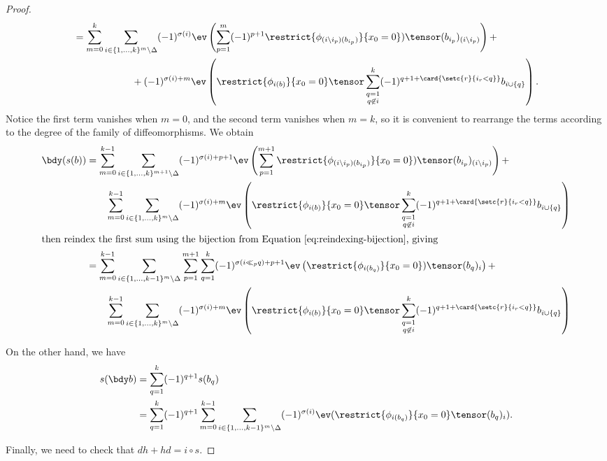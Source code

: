 \begin{proof}
\begin{align*}
                & = \sum_{m=0}^{k} \sum_{i \in \{1, \ldots, k\}^{m} \setminus \Delta}(-1)^{\sigma(i)} \ev\left(\sum_{p=1}^m (-1)^{p+1} \restrict{\phi_{(i\setminus i_p)(b_{i_p})}}{x_0 = 0})\tensor (b_{i_p})_{(i \setminus i_p)}\right) + \\
                & \qquad \qquad \qquad +  (-1)^{\sigma(i) + m} \ev\left(\restrict{\phi_{i(b)}}{x_0 = 0}\tensor \sum_{\substack{q=1 \\ q \not\in i}}^k (-1)^{q+1+\card{\setc{r}{i_r < q}}} b_{i \cup \{q\}}\right).
\end{align*}
Notice the first term vanishes when $m=0$, and the second term vanishes when $m=k$, so it is convenient to rearrange the terms according to the degree of the family of diffeomorphisms. We obtain
\begin{align*}
\bdy(s(b)) & = \sum_{m=0}^{k-1} \sum_{i \in \{1, \ldots, k\}^{m+1} \setminus \Delta}(-1)^{\sigma(i) + p + 1} \ev\left(\sum_{p=1}^{m+1} \restrict{\phi_{(i\setminus i_p)(b_{i_p})}}{x_0 = 0})\tensor (b_{i_p})_{(i \setminus i_p)}\right) + \\
                & \qquad \sum_{m=0}^{k-1} \sum_{i \in \{1, \ldots, k\}^{m} \setminus \Delta}   (-1)^{\sigma(i) + m} \ev\left(\restrict{\phi_{i(b)}}{x_0 = 0}\tensor \sum_{\substack{q=1 \\ q \not\in i}}^k (-1)^{q+1+\card{\setc{r}{i_r < q}}} b_{i \cup \{q\}}\right) \\
\intertext{then reindex the first sum using the bijection from Equation \eqref{eq:reindexing-bijection}, giving}
               & = \sum_{m=0}^{k-1} \sum_{i \in \{1, \ldots, k-1\}^{m} \setminus \Delta} \sum_{p=1}^{m+1} \sum_{q=1}^k (-1)^{\sigma(i \ll_p q) + p + 1} \ev\left( \restrict{\phi_{i(b_{q})}}{x_0 = 0})\tensor (b_{q})_{i}\right) + \\
                & \qquad \sum_{m=0}^{k-1} \sum_{i \in \{1, \ldots, k\}^{m} \setminus \Delta}   (-1)^{\sigma(i) + m} \ev\left(\restrict{\phi_{i(b)}}{x_0 = 0}\tensor \sum_{\substack{q=1 \\ q \not\in i}}^k (-1)^{q+1+\card{\setc{r}{i_r < q}}} b_{i \cup \{q\}}\right) \\
\end{align*}

On the other hand, we have
\begin{align*}
s(\bdy b) & = \sum_{q=1}^k (-1)^{q+1} s(b_q) \\
	       & = \sum_{q=1}^k (-1)^{q+1} \sum_{m=0}^{k-1} \sum_{i \in \{1, \ldots, k-1\}^{m} \setminus \Delta} (-1)^{\sigma(i)}  \ev(\restrict{\phi_{i(b_q)}}{x_0 = 0} \tensor (b_q)_i).
\end{align*}

Finally, we need to check that $dh+hd=i\circ s$. \todo{}
\end{proof}

